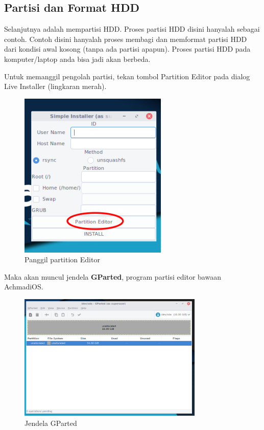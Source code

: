 \documentclass[12pt,]{article}
\begin{document}
	\newpage
	\subsection{Partisi dan Format HDD}
	
	Selanjutnya adalah mempartisi HDD.
	Proses partisi HDD disini hanyalah sebagai contoh.
	Contoh disini hanyalah proses membagi dan memformat partisi HDD dari kondisi awal kosong (tanpa ada partisi apapun).
	Proses partisi HDD pada komputer/laptop anda bisa jadi akan berbeda.
	
	Untuk memanggil pengolah partisi, tekan tombol Partition Editor pada dialog Live Installer (lingkaran merah).
	
	\begin{figure}[h]
		\centering
		\includegraphics[width=200pt]{installhdd/step_6}
		\caption{Panggil partition Editor}
	\end{figure}

	Maka akan muncul jendela \textbf{GParted}, program partisi editor bawaan AchmadiOS.
	
	\begin{figure}[h]
		\centering
		\includegraphics[width=250pt]{installhdd/step_7}
		\caption{Jendela GParted}
	\end{figure}
\end{document}
